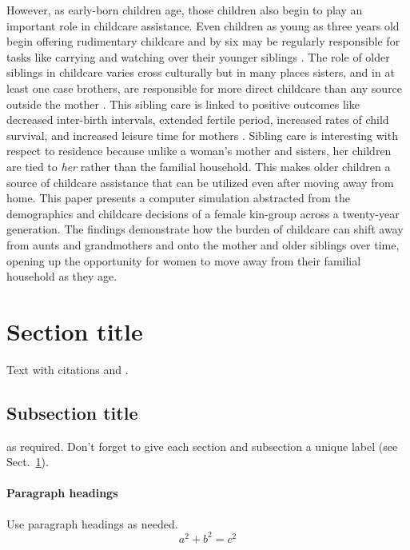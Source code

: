 \documentclass[smallextended]{svjour3}       %
\begin{document}
However, as early-born children age, those children also begin to play an important role in childcare assistance.  Even children as young as three years old begin offering rudimentary childcare and by six may be regularly responsible for tasks like carrying and watching over their younger siblings \cite{zeller1987role, kramer2004reconsidering, hames1988allocation, denham1974infant, dunbar2002helping}.  The role of older siblings in childcare varies cross culturally but in many places sisters, and in at least one case brothers, are responsible for more direct childcare than any source outside the mother \cite{kramer2005children}.  This sibling care is linked to positive outcomes like decreased inter-birth intervals, extended fertile period, increased rates of child survival, and increased leisure time for mothers \cite{turke1988helpers, Bereczei2002helping, crognier2001helpers, bove2002girl}.  Sibling care is interesting with respect to residence because unlike a woman's mother and sisters, her children are tied to \textit{her} rather than the familial household.  This makes older children a source of childcare assistance that can be utilized even after moving away from home.  This paper presents a computer simulation abstracted from the demographics and childcare decisions of a female kin-group across a twenty-year generation.  The findings demonstrate how the burden of childcare can shift away from aunts and grandmothers and onto the mother and older siblings over time, opening up the opportunity for women to move away from their familial household as they age.

\section{Section title}
\label{sec:1}
Text with citations \cite{RefB} and \cite{RefJ}.
\subsection{Subsection title}
\label{sec:2}
as required. Don't forget to give each section
and subsection a unique label (see Sect.~\ref{sec:1}).
\paragraph{Paragraph headings} Use paragraph headings as needed.
\begin{equation}
a^2+b^2=c^2
\end{equation}
\end{document}

